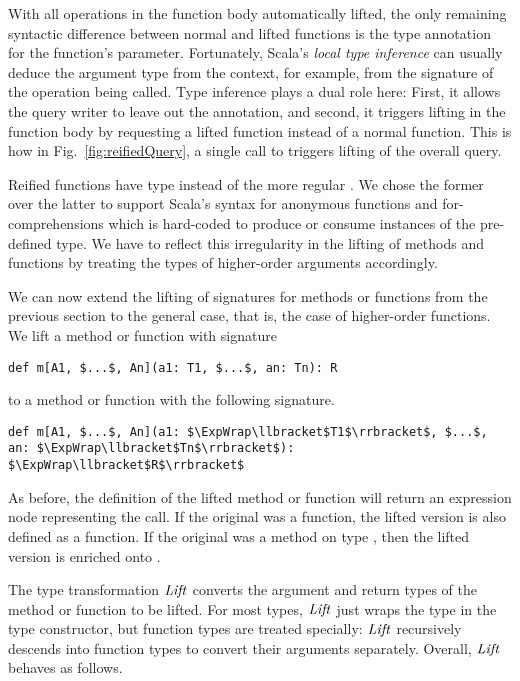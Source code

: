 With all operations in the function body automatically lifted, the only remaining syntactic difference between normal and lifted functions is the type annotation for the function's parameter. Fortunately, Scala's \emph{local type inference} can usually deduce the argument type from the context, for example, from the signature of the  operation being called. Type inference plays a dual role here: First, it allows the query writer to leave out the annotation, and second, it triggers lifting in the function body by requesting a lifted function instead of a normal function. This is how in Fig.~\ref{fig:reifiedQuery}, a single call to  triggers lifting of the overall query.

Reified functions have type  instead of the more regular . We chose the former over the latter to support Scala's syntax for anonymous functions and for-comprehensions which is hard-coded to produce or consume instances of the pre-defined  type. We have to reflect this irregularity in the lifting of methods and functions by treating the types of higher-order arguments accordingly.

We can now extend the lifting of signatures for methods or functions from the previous section to the general case, that is, the case of higher-order functions. We lift a method or function with signature
\begin{lstlisting}
def m[A1, $...$, An](a1: T1, $...$, an: Tn): R
\end{lstlisting}
to a method or function with the following signature.
\begin{lstlisting}
def m[A1, $...$, An](a1: $\ExpWrap\llbracket$T1$\rrbracket$, $...$, an: $\ExpWrap\llbracket$Tn$\rrbracket$): $\ExpWrap\llbracket$R$\rrbracket$
\end{lstlisting}
As before, the definition of the lifted method or function will return an expression node representing the call. If the original was a function, the lifted version is also defined as a function. If the original was a method on type , then the lifted version is enriched onto .

The type transformation $\mathit{Lift}$ converts the argument and return types of the method or function to be lifted. For most types, $\mathit{Lift}$ just wraps the type in the  type constructor, but function types are treated specially: $\mathit{Lift}$ recursively descends into function types to convert their arguments separately. Overall, $\mathit{Lift}$ behaves as follows.

